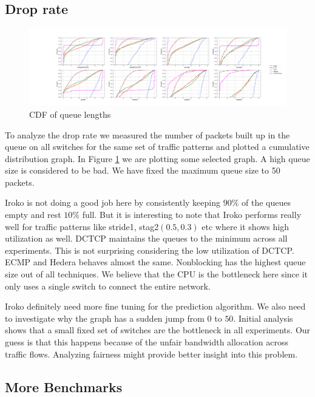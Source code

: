 \subsection{Drop rate}

\begin{figure}
	\centering
	\includegraphics[width=1\linewidth]{qlen.png}
	\caption{CDF of queue lengths}
	\label{fig:qlen}
\end{figure}

To analyze the drop rate we measured the number of packets built up in the queue
on all switches for the same set of traffic patterns and plotted a cumulative
distribution graph. In Figure \ref{fig:qlen} we are plotting some selected
graph. A high queue size is considered to be bad. We have fixed the maximum
queue size to 50 packets.

Iroko is not doing a good job here by consistently keeping $90\%$ of the queues
empty and rest $10\%$ full. But it is interesting to note that Iroko performs
really well for traffic patterns like stride1, stag2$(0.5,0.3)$ etc where it
shows high utilization as well. DCTCP maintains the queues to the minimum across
all experiments. This is not surprising considering the low utilization of
DCTCP. ECMP and Hedera behaves almost the same. Nonblocking has the highest
queue size out of all techniques. We believe that the CPU is the bottleneck here
since it only uses a single switch to connect the entire network.

Iroko definitely need more fine tuning for the prediction algorithm. We also
need to investigate why the graph has a sudden jump from $0$ to $50$. Initial
analysis shows that a small fixed set of switches are the bottleneck in all
experiments. Our guess is that this happens because of the unfair bandwidth
allocation across traffic flows. Analyzing fairness might provide better insight
into this problem.

\subsection{More Benchmarks}

